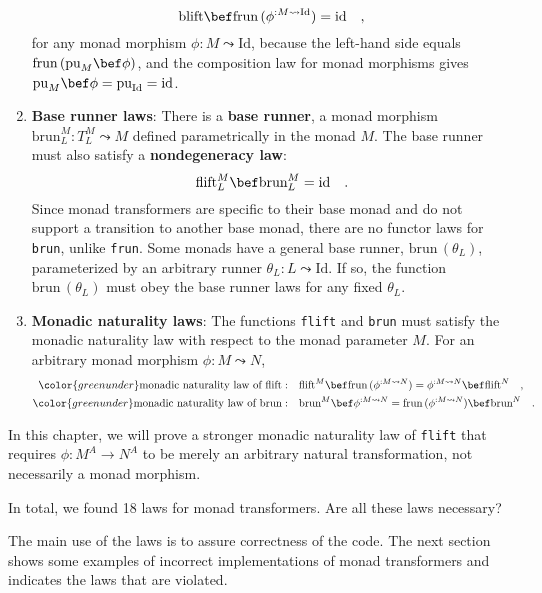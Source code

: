 \begin{enumerate}
\[
\text{blift}\bef\text{frun}\,(\phi^{:M\leadsto\text{Id}})=\text{id}\quad,
\]
for any monad morphism $\phi:M\leadsto\text{Id}$, because the left-hand
side equals $\text{frun}\,(\text{pu}_{M}\bef\phi)$, and the composition
law for monad morphisms gives $\text{pu}_{M}\bef\phi=\text{pu}_{\text{Id}}=\text{id}$.
\item \textbf{Base runner laws}:
There is a \textbf{base runner}, a monad morphism $\text{brun}_{L}^{M}:T_{L}^{M}\leadsto M$
defined parametrically in the monad $M$. The base runner must also
satisfy a \textbf{nondegeneracy law}:
\[
\text{flift}_{L}^{M}\bef\text{brun}_{L}^{M}=\text{id}\quad.
\]
Since monad transformers are specific to their base monad and do not
support a transition to another base monad, there are no functor laws
for \lstinline!brun!, unlike \lstinline!frun!. Some monads have
a general base runner, $\text{brun}\,(\theta_{L})$, parameterized
by an arbitrary runner $\theta_{L}:L\leadsto\text{Id}$. If so, the
function $\text{brun}\,(\theta_{L})$ must obey the base runner laws
for any fixed $\theta_{L}$.
\item \textbf{Monadic naturality laws}: 
The functions \lstinline!flift! and \lstinline!brun! must satisfy
the monadic naturality law with respect to the monad parameter $M$.
For an arbitrary monad morphism $\phi:M\leadsto N$,
\begin{align*}
{\color{greenunder}\text{monadic naturality law of }\text{flift}:}\quad & \text{flift}^{M}\bef\text{frun}\,(\phi^{:M\leadsto N})=\phi^{:M\leadsto N}\bef\text{flift}^{N}\quad,\\
{\color{greenunder}\text{monadic naturality law of }\text{brun}:}\quad & \text{brun}^{M}\bef\phi^{:M\leadsto N}=\text{frun}\,(\phi^{:M\leadsto N})\bef\text{brun}^{N}\quad.
\end{align*}
\end{enumerate}
In this chapter, we will prove a stronger monadic naturality law of
\lstinline!flift! that requires $\phi:M^{A}\rightarrow N^{A}$ to
be merely an arbitrary natural transformation, not necessarily a monad
morphism.

In total, we found 18 laws for monad transformers. Are all these laws
necessary? 

The main use of the laws is to assure correctness of the code. The
next section shows some examples of incorrect implementations of monad
transformers and indicates the laws that are violated.

